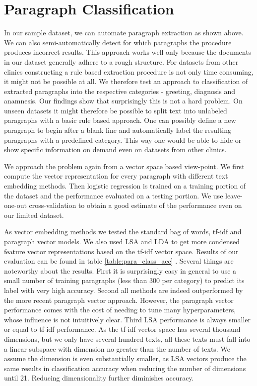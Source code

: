 \section{Paragraph Classification}
In our sample dataset, we can automate paragraph extraction as shown above. We can also semi-automatically detect for which paragraphs the procedure produces incorrect results. This approach works well only because the documents in our dataset generally adhere to a rough structure. For datasets from other clinics constructing a rule based extraction procedure is not only time consuming, it might not be possible at all. We therefore test an approach to classification of extracted paragraphs into the respective categories - greeting, diagnosis and anamnesis. Our findings show that surprisingly this is not a hard problem. On unseen datasets it might therefore be possible to split text into unlabeled paragraphs with a basic rule based approach. One can possibly define a new paragraph to begin after a blank line and automatically label the resulting paragraphs with a predefined category. This way one would be able to hide or show specific information on demand even on datasets from other clinics.

We approach the problem again from a vector space based view-point. We first compute the vector representation for every paragraph with different text embedding methods. Then logistic regression is trained on a training portion of the dataset and the performance evaluated on a testing portion. We use leave-one-out cross-validation to obtain a good estimate of the performance even on our limited dataset.

As vector embedding methods we tested the standard bag of words, tf-idf and paragraph vector models. We also used LSA and LDA to get more condensed feature vector representations based on the tf-idf vector space. Results of our evaluation can be found in table \ref{table:para_class_acc}   . Several things are noteworthy about the results. First it is surprisingly easy in general to use a small number of training paragraphs (less than 300 per category) to predict its label with very high accuracy. Second all methods are indeed outperformed by the more recent paragraph vector approach. However, the paragraph vector performance comes with the cost of needing to tune many hyperparameters, whose influence is not intuitively clear. Third LSA performance is always smaller or equal to tf-idf performance. As the tf-idf vector space has several thousand dimensions, but we only have several hundred texts, all these texts must fall into a linear subspace with dimension no greater than the number of texts. We assume the dimension is even substantially smaller, as LSA vectors produce the same results in classification accuracy when reducing the number of dimensions until 21. Reducing dimensionality further diminishes accuracy. 


